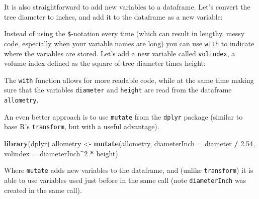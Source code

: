 \documentclass[]{book}
\newenvironment{Shaded}{\begin{snugshade}}{\end{snugshade}}
\newcommand{\DataTypeTok}[1]{\textcolor[rgb]{0.13,0.29,0.53}{#1}}
\newcommand{\DecValTok}[1]{\textcolor[rgb]{0.00,0.00,0.81}{#1}}
\newcommand{\FloatTok}[1]{\textcolor[rgb]{0.00,0.00,0.81}{#1}}
\newcommand{\KeywordTok}[1]{\textcolor[rgb]{0.13,0.29,0.53}{\textbf{#1}}}
\newcommand{\NormalTok}[1]{#1}
\newcommand{\OperatorTok}[1]{\textcolor[rgb]{0.81,0.36,0.00}{\textbf{#1}}}
\newcommand{\StringTok}[1]{\textcolor[rgb]{0.31,0.60,0.02}{#1}}
\begin{document}
It is also straightforward to add new variables to a dataframe. Let's convert the tree diameter to inches, and add it to the dataframe as a new variable:

\begin{Shaded}
\end{Shaded}

Instead of using the \texttt{\$}-notation every time (which can result in lengthy, messy code, especially when your variable names are long) you can use \texttt{with} to indicate where the variables are stored. Let's add a new variable called \texttt{volindex}, a volume index defined as the square of tree diameter times height:

\begin{Shaded}
\end{Shaded}

The \texttt{with} function allows for more readable code, while at the same time making sure that the variables \texttt{diameter} and \texttt{height} are read from the dataframe \texttt{allometry}.

An even better approach is to use \texttt{mutate} from the \texttt{dplyr} package (similar to base R's \texttt{transform}, but with a useful advantage).

\begin{Shaded}
\begin{Highlighting}[]
\KeywordTok{library}\NormalTok{(dplyr)}
\NormalTok{allometry <-}\StringTok{ }\KeywordTok{mutate}\NormalTok{(allometry, }
                \DataTypeTok{diameterInch =}\NormalTok{ diameter }\OperatorTok{/}\StringTok{ }\FloatTok{2.54}\NormalTok{,}
                \DataTypeTok{volindex =}\NormalTok{ diameterInch}\OperatorTok{^}\DecValTok{2} \OperatorTok{*}\StringTok{ }\NormalTok{height)}
\end{Highlighting}
\end{Shaded}

Where \texttt{mutate} adds new variables to the dataframe, and (unlike \texttt{transform}) it is able to use variables used just before in the same call (note \texttt{diameterInch} was created in the same call).
\end{document}
